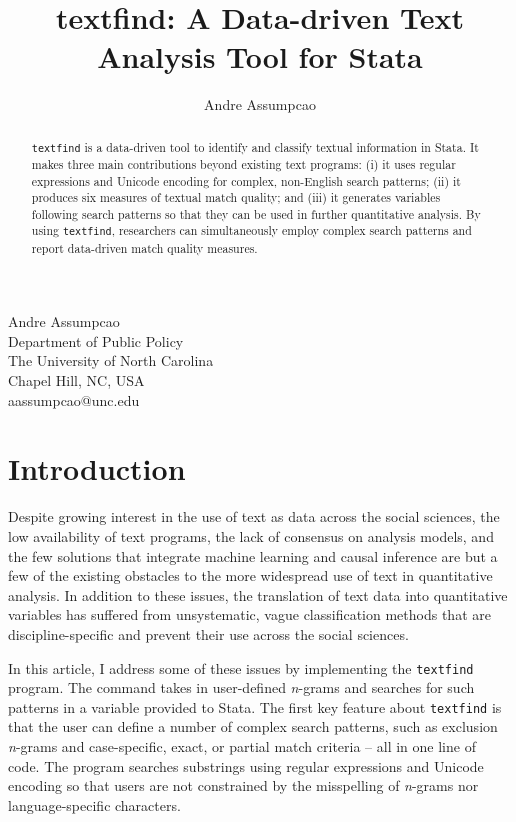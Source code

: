 
\author{Andre Assumpcao}{Andre Assumpcao\\Department of Public Policy\\The University of North Carolina\\Chapel Hill, NC, USA\\aassumpcao@unc.edu}
\title[textfind]{textfind: A Data-driven Text Analysis Tool for Stata}

\maketitle

\begin{abstract}
{\tt textfind} is a data-driven tool to identify and classify textual information in Stata. It makes three main contributions beyond existing text programs: (i) it uses regular expressions and Unicode encoding for complex, non-English search patterns; (ii) it produces six measures of textual match quality; and (iii) it generates variables following search patterns so that they can be used in further quantitative analysis. By using {\tt textfind}, researchers can simultaneously employ complex search patterns and report data-driven match quality measures.

\end{abstract}

\section[Introduction]{Introduction} \label{sec:1}
Despite growing interest in the use of text as data across the social sciences, the low availability of text programs, the lack of consensus on analysis models, and the few solutions that integrate machine learning and causal inference are but a few of the existing obstacles to the more widespread use of text in quantitative analysis. In addition to these issues, the translation of text data into quantitative variables has suffered from unsystematic, vague classification methods that are discipline-specific and prevent their use across the social sciences.

In this article, I address some of these issues by implementing the {\tt textfind} program. The command takes in user-defined {\it n}-grams and searches for such patterns in a variable provided to Stata. The first key feature about {\tt textfind} is that the user can define a number of complex search patterns, such as exclusion {\it n}-grams and case-specific, exact, or partial match criteria -- all in one line of code. The program searches substrings using regular expressions and Unicode encoding so that users are not constrained by the misspelling of {\it n}-grams nor language-specific characters.

